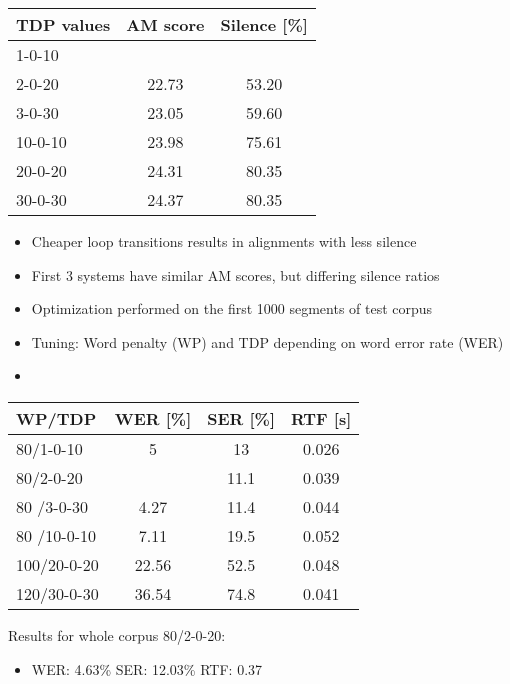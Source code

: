 \documentclass[11pt, a4paper, landscape]{article}
\begin{document}
\begin{center}
\begin{tabular}{| l |  c | c |} \toprule
  TDP values & AM score           & Silence [\%]      \\ \midrule
  1-0-10     & \color{red}{22.68} & \color{red}{43.48}\\
  2-0-20     & 22.73              & 53.20             \\
  3-0-30     & 23.05              & 59.60             \\ \midrule
  10-0-10    & 23.98              & 75.61             \\
  20-0-20    & 24.31              & 80.35             \\
  30-0-30    & 24.37              & 80.35             \\ \bottomrule
\end{tabular}
\end{center}
\begin{itemize}
	\item Cheaper loop transitions results in alignments with less silence
	\item First 3 systems have similar AM scores, but differing silence ratios
\end{itemize}
\vfill


\NewPage{}
\vfill
\begin{itemize}
	\item Optimization performed on the first 1000 segments of test corpus
	\item Tuning: Word penalty (WP) and TDP depending on word error rate (WER)
	\item \color{red}{no need to show SER and RTF if you tune on WER and RTF is not given in seconds. It's a ratio :)}
\end{itemize}

\begin{center}
	\begin{tabular}{| l | c | c | c |} \toprule
		WP/TDP      &    WER [\%]    & SER [\%]    & RTF [s]    \\ \midrule
		80/1-0-10   &    5           &    13       & 0.026      \\
		80/2-0-20   &\color{red}{4.2}&    11.1     & 0.039      \\
		80 /3-0-30  &    4.27        &    11.4     & 0.044      \\ \midrule
		80 /10-0-10 &    7.11        &    19.5     & 0.052      \\
		100/20-0-20 &    22.56       &    52.5     & 0.048      \\
		120/30-0-30 &    36.54       &    74.8     & 0.041      \\ \bottomrule
		
	\end{tabular}
\end{center}
Results for whole corpus 80/2-0-20:
\begin{itemize}
	\item WER: 4.63\% SER: 12.03\%  RTF: 0.37
\end{itemize}
\vfill
\end{document}
